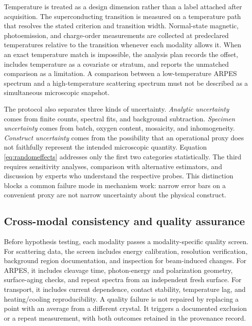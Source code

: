 \documentclass[conference]{IEEEtran}
\begin{document}
Temperature is treated as a design dimension rather than a label attached after acquisition. The superconducting transition is measured on a temperature path that resolves the stated criterion and transition width. Normal-state magnetic, photoemission, and charge-order measurements are collected at predeclared temperatures relative to the transition whenever each modality allows it. When an exact temperature match is impossible, the analysis plan records the offset, includes temperature as a covariate or stratum, and reports the unmatched comparison as a limitation. A comparison between a low-temperature ARPES spectrum and a high-temperature scattering spectrum must not be described as a simultaneous microscopic snapshot.

The protocol also separates three kinds of uncertainty. \emph{Analytic uncertainty} comes from finite counts, spectral fits, and background subtraction. \emph{Specimen uncertainty} comes from batch, oxygen content, mosaicity, and inhomogeneity. \emph{Construct uncertainty} comes from the possibility that an operational proxy does not faithfully represent the intended microscopic quantity. Equation \eqref{eq:randomeffects} addresses only the first two categories statistically. The third requires sensitivity analyses, comparison with alternative estimators, and discussion by experts who understand the respective probes. This distinction blocks a common failure mode in mechanism work: narrow error bars on a convenient proxy are not narrow uncertainty about the physical construct.

\subsection{Cross-modal consistency and quality assurance}

Before hypothesis testing, each modality passes a modality-specific quality screen. For scattering data, the screen includes energy calibration, resolution verification, background region documentation, and inspection for beam-induced changes. For ARPES, it includes cleavage time, photon-energy and polarization geometry, surface-aging checks, and repeat spectra from an independent fresh surface. For transport, it includes current dependence, contact stability, temperature lag, and heating/cooling reproducibility. A quality failure is not repaired by replacing a point with an average from a different crystal. It triggers a documented exclusion or a repeat measurement, with both outcomes retained in the provenance record.
\end{document}
